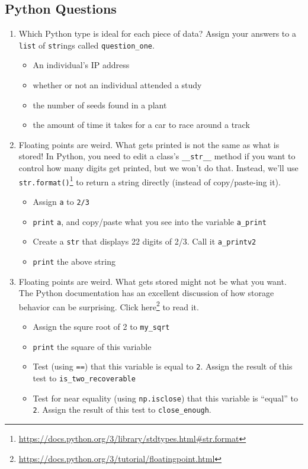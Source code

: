 \documentclass[
  12pt,
  krantz2]{krantz}
\providecommand{\tightlist}{%
  \setlength{\itemsep}{0pt}\setlength{\parskip}{0pt}}
\renewcommand{\href}[2]{#2\footnote{\url{#1}}}
\begin{document}
\hypertarget{python-questions}{%
\subsection{Python Questions}\label{python-questions}}

\begin{enumerate}
\def\labelenumi{\arabic{enumi}.}
\item
  Which Python type is ideal for each piece of data? Assign your answers to a \texttt{list} of \texttt{str}ings called \texttt{question\_one}.

  \begin{itemize}
  \tightlist
  \item
    An individual's IP address
  \item
    whether or not an individual attended a study
  \item
    the number of seeds found in a plant
  \item
    the amount of time it takes for a car to race around a track
  \end{itemize}
\item
  Floating points are weird. What gets printed is not the same as what is stored! In Python, you need to edit a class's \texttt{\_\_str\_\_} method if you want to control how many digits get printed, but we won't do that. Instead, we'll use \href{https://docs.python.org/3/library/stdtypes.html\#str.format}{\texttt{str.format()}} to return a string directly (instead of copy/paste-ing it).

  \begin{itemize}
  \tightlist
  \item
    Assign \texttt{a} to \texttt{2/3}
  \item
    \texttt{print} \texttt{a}, and copy/paste what you see into the variable \texttt{a\_print}
  \item
    Create a \texttt{str} that displays 22 digits of 2/3. Call it \texttt{a\_printv2}
  \item
    \texttt{print} the above string
  \end{itemize}
\item
  Floating points are weird. What gets stored might not be what you want. The Python documentation has an excellent discussion of how storage behavior can be surprising. Click \href{https://docs.python.org/3/tutorial/floatingpoint.html}{here} to read it.

  \begin{itemize}
  \tightlist
  \item
    Assign the squre root of 2 to \texttt{my\_sqrt}
  \item
    \texttt{print} the square of this variable
  \item
    Test (using \texttt{==}) that this variable is equal to \texttt{2}. Assign the result of this test to \texttt{is\_two\_recoverable}
  \item
    Test for near equality (using \texttt{np.isclose}) that this variable is ``equal'' to \texttt{2}. Assign the result of this test to \texttt{close\_enough}.
  \end{itemize}
\end{enumerate}
\end{document}
